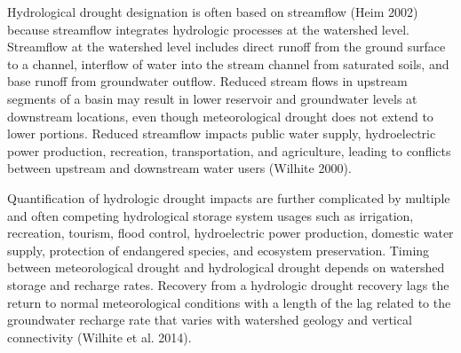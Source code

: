 \documentclass[12pt,twoside]{reedthesis}
\theoremstyle{definition}
\theoremstyle{definition}
\theoremstyle{definition}
\theoremstyle{remark}
\begin{document}
Hydrological drought designation is often based on streamflow (Heim
2002) because streamflow integrates hydrologic processes at the
watershed level. Streamflow at the watershed level includes direct
runoff from the ground surface to a channel, interflow of water into the
stream channel from saturated soils, and base runoff from groundwater
outflow. Reduced stream flows in upstream segments of a basin may result
in lower reservoir and groundwater levels at downstream locations, even
though meteorological drought does not extend to lower portions. Reduced
streamflow impacts public water supply, hydroelectric power production,
recreation, transportation, and agriculture, leading to conflicts
between upstream and downstream water users (Wilhite 2000).

Quantification of hydrologic drought impacts are further complicated by
multiple and often competing hydrological storage system usages such as
irrigation, recreation, tourism, flood control, hydroelectric power
production, domestic water supply, protection of endangered species, and
ecosystem preservation. Timing between meteorological drought and
hydrological drought depends on watershed storage and recharge rates.
Recovery from a hydrologic drought recovery lags the return to normal
meteorological conditions with a length of the lag related to the
groundwater recharge rate that varies with watershed geology and
vertical connectivity (Wilhite et al. 2014).
\end{document}
